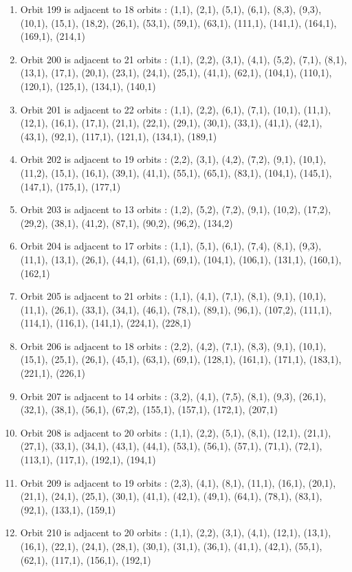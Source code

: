 \documentclass[12pt]{article}
\begin{document}
\begin{enumerate}
\item Orbit 199 is adjacent to 18 orbits : (1,1), (2,1), (5,1), (6,1), (8,3), (9,3), (10,1), (15,1), (18,2), (26,1), (53,1), (59,1), (63,1), (111,1), (141,1), (164,1), (169,1), (214,1)
\item Orbit 200 is adjacent to 21 orbits : (1,1), (2,2), (3,1), (4,1), (5,2), (7,1), (8,1), (13,1), (17,1), (20,1), (23,1), (24,1), (25,1), (41,1), (62,1), (104,1), (110,1), (120,1), (125,1), (134,1), (140,1)
\item Orbit 201 is adjacent to 22 orbits : (1,1), (2,2), (6,1), (7,1), (10,1), (11,1), (12,1), (16,1), (17,1), (21,1), (22,1), (29,1), (30,1), (33,1), (41,1), (42,1), (43,1), (92,1), (117,1), (121,1), (134,1), (189,1)
\item Orbit 202 is adjacent to 19 orbits : (2,2), (3,1), (4,2), (7,2), (9,1), (10,1), (11,2), (15,1), (16,1), (39,1), (41,1), (55,1), (65,1), (83,1), (104,1), (145,1), (147,1), (175,1), (177,1)
\item Orbit 203 is adjacent to 13 orbits : (1,2), (5,2), (7,2), (9,1), (10,2), (17,2), (29,2), (38,1), (41,2), (87,1), (90,2), (96,2), (134,2)
\item Orbit 204 is adjacent to 17 orbits : (1,1), (5,1), (6,1), (7,4), (8,1), (9,3), (11,1), (13,1), (26,1), (44,1), (61,1), (69,1), (104,1), (106,1), (131,1), (160,1), (162,1)
\item Orbit 205 is adjacent to 21 orbits : (1,1), (4,1), (7,1), (8,1), (9,1), (10,1), (11,1), (26,1), (33,1), (34,1), (46,1), (78,1), (89,1), (96,1), (107,2), (111,1), (114,1), (116,1), (141,1), (224,1), (228,1)
\item Orbit 206 is adjacent to 18 orbits : (2,2), (4,2), (7,1), (8,3), (9,1), (10,1), (15,1), (25,1), (26,1), (45,1), (63,1), (69,1), (128,1), (161,1), (171,1), (183,1), (221,1), (226,1)
\item Orbit 207 is adjacent to 14 orbits : (3,2), (4,1), (7,5), (8,1), (9,3), (26,1), (32,1), (38,1), (56,1), (67,2), (155,1), (157,1), (172,1), (207,1)
\item Orbit 208 is adjacent to 20 orbits : (1,1), (2,2), (5,1), (8,1), (12,1), (21,1), (27,1), (33,1), (34,1), (43,1), (44,1), (53,1), (56,1), (57,1), (71,1), (72,1), (113,1), (117,1), (192,1), (194,1)
\item Orbit 209 is adjacent to 19 orbits : (2,3), (4,1), (8,1), (11,1), (16,1), (20,1), (21,1), (24,1), (25,1), (30,1), (41,1), (42,1), (49,1), (64,1), (78,1), (83,1), (92,1), (133,1), (159,1)
\item Orbit 210 is adjacent to 20 orbits : (1,1), (2,2), (3,1), (4,1), (12,1), (13,1), (16,1), (22,1), (24,1), (28,1), (30,1), (31,1), (36,1), (41,1), (42,1), (55,1), (62,1), (117,1), (156,1), (192,1)

\end{enumerate}
\end{document}
